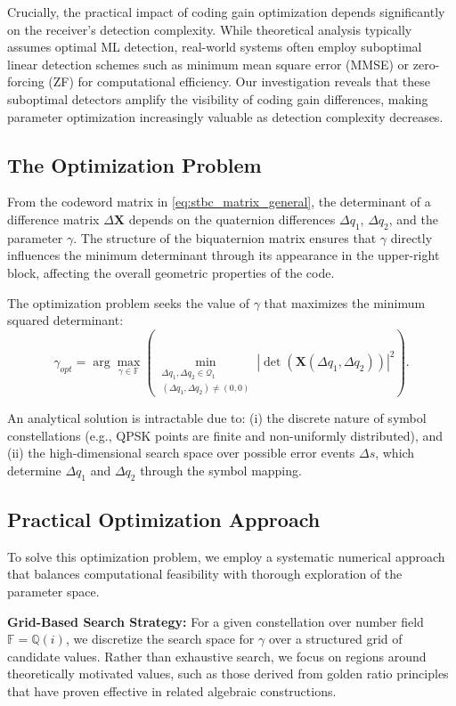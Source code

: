 Crucially, the practical impact of coding gain optimization depends significantly on the receiver's detection complexity. 
While theoretical analysis typically assumes optimal ML detection, real-world systems often employ suboptimal linear detection schemes such as minimum mean square error (MMSE) or zero-forcing (ZF) for computational efficiency.
Our investigation reveals that these suboptimal detectors amplify the visibility of coding gain differences, making parameter optimization increasingly valuable as detection complexity decreases.

\subsection{The Optimization Problem}
From the codeword matrix in \eqref{eq:stbc_matrix_general}, the determinant of a difference matrix $\Delta\mathbf{X}$ depends on the quaternion differences $\Delta q_1$, $\Delta q_2$, and the parameter $\gamma$. The structure of the biquaternion matrix ensures that $\gamma$ directly influences the minimum determinant through its appearance in the upper-right block, affecting the overall geometric properties of the code.

The optimization problem seeks the value of $\gamma$ that maximizes the minimum squared determinant:
\begin{equation} \label{eq:optimization}
\gamma_{opt} = \arg \max_{\gamma \in \mathbb{F}} \left( \min_{\substack{\Delta q_1, \Delta q_2 \in \mathcal{Q}_1 \\ (\Delta q_1, \Delta q_2) \neq (0,0)}} |\det(\mathbf{X}(\Delta q_1, \Delta q_2))|^2 \right).
\end{equation}

An analytical solution is intractable due to: 
(i) the discrete nature of symbol constellations (e.g., QPSK points are finite and non-uniformly distributed), and 
(ii) the high-dimensional search space over possible error events $\Delta s$, which determine $\Delta q_1$ and $\Delta q_2$ through the symbol mapping.

\subsection{Practical Optimization Approach}
To solve this optimization problem, we employ a systematic numerical approach that balances computational feasibility with thorough exploration of the parameter space.

\textbf{Grid-Based Search Strategy:} For a given constellation over number field $\mathbb{F} = \mathbb{Q}(i)$, we discretize the search space for $\gamma$ over a structured grid of candidate values. 
Rather than exhaustive search, we focus on regions around theoretically motivated values, such as those derived from golden ratio principles that have proven effective in related algebraic constructions.

